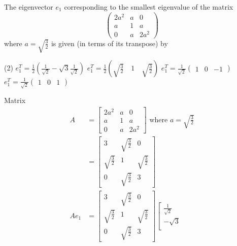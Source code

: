 \begin{questions}
\begin{answer}
\end{answer}
\begin{minipage}{\textwidth}
	\question The eigenvector $e_{1}$ corresponding to the smallest eigenvalue of the matrix
	$$
	\left(\begin{array}{ccc}
	2 a^{2} & a & 0 \\
	a & 1 & a \\
	0 & a & 2 a^{2}
	\end{array}\right)
	$$
	where $a=\sqrt{\frac{3}{2}}$ is given (in terms of its transpose) by
\end{minipage}
\begin{tasks}(2)
	\task[\textbf{A.}] $e_{1}^{T}=\frac{1}{2}\left(\frac{1}{\sqrt{2}}-\sqrt{3} \frac{1}{\sqrt{2}}\right)$
	\task[\textbf{B.}] $e_{1}^{T}=\frac{1}{2}\left(\sqrt{\frac{3}{2}} \quad 1 \quad \sqrt{\frac{3}{2}}\right)$
	\task[\textbf{C.}] $e_{1}^{T}=\frac{1}{\sqrt{2}}\left(\begin{array}{lll}1 & 0 & -1\end{array}\right)$
	\task[\textbf{D.}] $e_{1}^{T}=\frac{1}{\sqrt{2}}\left(\begin{array}{lll}1 & 0 & 1\end{array}\right)$
\end{tasks}
\begin{answer}
	Matrix
	$$
	\begin{aligned}
	A &=\left[\begin{array}{ccc}
	2 a^{2} & a & 0 \\
	a & 1 & a \\
	0 & a & 2 a^{2}
	\end{array}\right] \text { where } a=\sqrt{\frac{3}{2}} \\
	&=\left[\begin{array}{ccc}
	3 & \sqrt{\frac{3}{2}} & 0 \\
	\sqrt{\frac{3}{2}} & 1 & \sqrt{\frac{3}{2}} \\
	0 & \sqrt{\frac{3}{2}} & 3
	\end{array}\right] \\
	A e_{1} &=\left[\begin{array}{ccc}
	3 & \sqrt{\frac{3}{2}} & 0 \\
	\sqrt{\frac{3}{2}} & 1 & \sqrt{\frac{3}{2}} \\
	0 & \sqrt{\frac{3}{2}} & 3
	\end{array}\right]\left[\begin{array}{c}
	\frac{1}{\sqrt{2}} \\
	-\sqrt{3} \\

\end{array}
\end{aligned}$$
\end{answer}
\end{questions}
